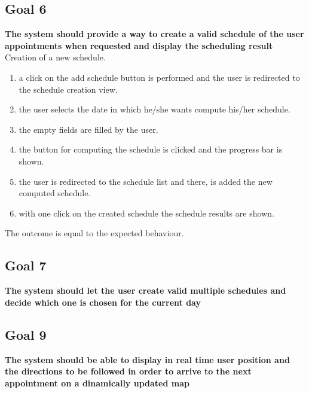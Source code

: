 
\subsection{Goal 6}
\textbf{The system should provide a way to create a valid schedule of the user appointments when requested and display the scheduling result}\\

{Creation of a new schedule.}
{{\begin{enumerate}
\item a click on the add schedule button is performed and the user is redirected to the schedule creation view.
\item the user selects the date in which he/she wants compute his/her schedule.
\item the empty fields are filled by the user.
\item the button for computing the schedule is clicked and the progress bar is shown.
\item the user is redirected to the schedule list and there, is added the new computed schedule.
\item with one click on the created schedule the schedule results are shown.
\end{enumerate}}}
{The outcome is equal to the expected behaviour.}

\subsection{Goal 7}
\textbf{The system should let the user create valid multiple schedules and decide which one is chosen for the current day}\\



\subsection{Goal 9}
\textbf{The system should be able to display in real time user position and the directions to be followed in order to arrive to the next appointment on a dinamically updated map}\\


